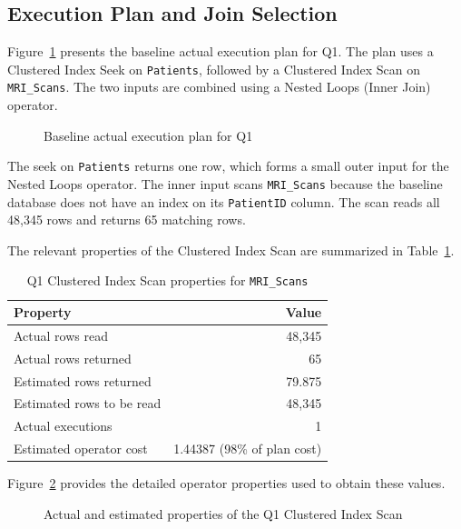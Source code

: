 \subsection{Execution Plan and Join Selection}

Figure~\ref{fig:q1-plan} presents the baseline actual execution plan for Q1. The plan uses a Clustered Index Seek on \texttt{Patients}, followed by a Clustered Index Scan on \texttt{MRI\_Scans}. The two inputs are combined using a Nested Loops (Inner Join) operator.

\begin{figure}[htbp]
\centering
{}
\caption{Baseline actual execution plan for Q1}
\label{fig:q1-plan}
\end{figure}

The seek on \texttt{Patients} returns one row, which forms a small outer input for the Nested Loops operator. The inner input scans \texttt{MRI\_Scans} because the baseline database does not have an index on its \texttt{PatientID} column. The scan reads all 48,345 rows and returns 65 matching rows.

The relevant properties of the Clustered Index Scan are summarized in Table~\ref{tab:q1-scan}.

\newpage

\begin{table}[htbp]
\centering
\caption{Q1 Clustered Index Scan properties for \texttt{MRI\_Scans}}
\label{tab:q1-scan}
\begin{tabular}{lr}
\toprule
Property & Value \\
\midrule
Actual rows read & 48,345 \\
Actual rows returned & 65 \\
Estimated rows returned & 79.875 \\
Estimated rows to be read & 48,345 \\
Actual executions & 1 \\
Estimated operator cost & 1.44387 (98\% of plan cost) \\
\bottomrule
\end{tabular}
\end{table}

Figure~\ref{fig:q1-operator} provides the detailed operator properties used to obtain these values.

\begin{figure}[htbp]
\centering
{}
\caption{Actual and estimated properties of the Q1 Clustered Index Scan}
\label{fig:q1-operator}
\end{figure}

